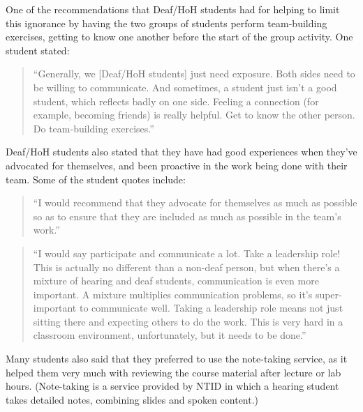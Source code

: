 \documentclass[conference]{IEEEtran}
\begin{document}
One of the recommendations that Deaf/HoH students had for helping to limit this ignorance by having the two groups of students perform team-building exercises, getting to know one another before the start of the group activity. One student stated:

\begin{quotation}
``Generally, we [Deaf/HoH students] just need exposure. Both sides need to be willing to communicate. And sometimes, a student just isn't a good student, which reflects badly on one side. Feeling a connection (for example, becoming friends) is really helpful. Get to know the other person. Do team-building exercises.''
\end{quotation}

Deaf/HoH students also stated that they have had good experiences when they've advocated for themselves, and been proactive in the work being done with their team. Some of the student quotes include:

\begin{quotation}
``I would recommend that they advocate for themselves as much as possible so as to ensure that they are included as much as possible in the team's work.''
\end{quotation}

\begin{quotation}
``I would say participate and communicate a lot. Take a leadership role! This is actually no different than a non-deaf person, but when there's a mixture of hearing and deaf students, communication is even more important. A mixture multiplies communication problems, so it's super-important to communicate well. Taking a leadership role means not just sitting there and expecting others to do the work. This is very hard in a classroom environment, unfortunately, but it needs to be done.''
\end{quotation}


Many students also said that they preferred to use the note-taking service, as it helped them very much with reviewing the course material after lecture or lab hours. (Note-taking is a service provided by NTID in which a hearing student takes detailed notes, combining slides and spoken content.)
\end{document}
